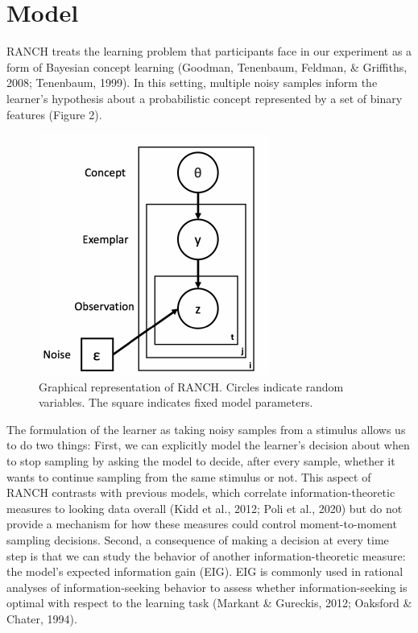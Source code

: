 \documentclass[10pt, letterpaper]{article}
\newenvironment{CodeChunk}{}{}
\begin{document}
\hypertarget{model}{%
\section{Model}\label{model}}

RANCH treats the learning problem that participants face in our
experiment as a form of Bayesian concept learning (Goodman, Tenenbaum,
Feldman, \& Griffiths, 2008; Tenenbaum, 1999). In this setting, multiple
noisy samples inform the learner's hypothesis about a probabilistic
concept represented by a set of binary features (Figure 2).

\begin{CodeChunk}
\begin{figure}[H]

{\centering \includegraphics{figs/plate_diagram-1} 

}

\caption[Graphical representation of RANCH]{Graphical representation of RANCH. Circles indicate random variables. The square indicates fixed model parameters.}\label{fig:plate_diagram}
\end{figure}
\end{CodeChunk}

The formulation of the learner as taking noisy samples from a stimulus
allows us to do two things: First, we can explicitly model the learner's
decision about when to stop sampling by asking the model to decide,
after every sample, whether it wants to continue sampling from the same
stimulus or not. This aspect of RANCH contrasts with previous models,
which correlate information-theoretic measures to looking data overall
(Kidd et al., 2012; Poli et al., 2020) but do not provide a mechanism
for how these measures could control moment-to-moment sampling
decisions. Second, a consequence of making a decision at every time step
is that we can study the behavior of another information-theoretic
measure: the model's expected information gain (EIG). EIG is commonly
used in rational analyses of information-seeking behavior to assess
whether information-seeking is optimal with respect to the learning task
(Markant \& Gureckis, 2012; Oaksford \& Chater, 1994).
\end{document}
